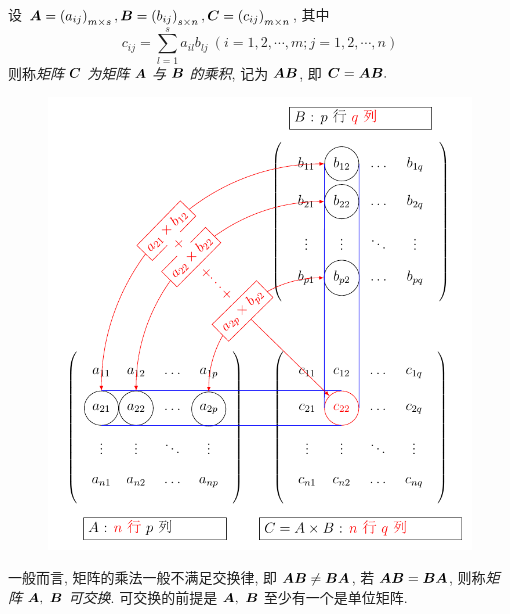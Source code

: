 \begin{definition}[矩阵乘法]
    设 $ \vb*{A}=\left(a_{i j}\right)_{m \times s}, \vb*{B}=\left(b_{i j}\right)_{s \times n}, \vb*{C}=\left(c_{i j}\right)_{m \times n} $,
    其中 $$c_{i j}=\sum_{l=1}^{s} a_{i l} b_{l j}~ (i=1,2, \cdots, m ; j=1,2, \cdots, n)$$
    则称\textit{矩阵} $ \vb*{C} $ \textit{为矩阵} $ \vb*{A} $ \textit{与} $ \vb*{B} $ \textit{的乘积},
    记为 $ \vb*{AB} $, 即 $ \vb*{C}=\vb*{AB} .$
\end{definition}

\begin{figure}[H]
    \centering
    \includegraphics[scale=0.75]{figures/matrix-multiplication.pdf}
    \caption{}
\end{figure}

\begin{definition}[可交换矩阵]
    一般而言, 矩阵的乘法一般不满足交换律, 即 $\vb*{AB}\neq\vb*{BA}$, 若 $\vb*{AB}=\vb*{BA}$, 则称\textit{矩阵} $\vb*{A},~\vb*{B}$ \textit{可交换}.
    可交换的前提是 $\vb*{A},~\vb*{B}$ 至少有一个是单位矩阵.
\end{definition}

